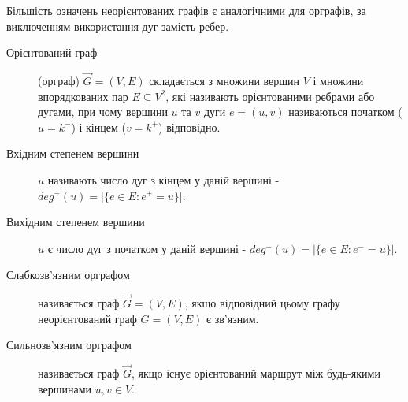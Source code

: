 
Більшість означень неорієнтованих графів є аналогічними для орграфів, за виключенням використання дуг замість ребер.

\begin{description}
  \item[Орієнтований граф] (орграф) $\overrightarrow G=(V,E)$ складається з множини вершин $V$ і множини впорядкованих пар $E \subseteq V^2$, які називають орієнтованими ребрами або дугами, при чому вершини $u$ та $v$ дуги $e=(u,v)$ називаються початком ($u=k^-$) і кінцем ($v=k^+$) відповідно.
  \item[Вхідним степенем вершини] $u$ називають число дуг з кінцем у даній вершині - $deg^+(u)=\vert\lbrace e \in E : e^+=u\rbrace \vert$.
  \item[Вихідним степенем вершини] $u$ є число дуг з початком у даній вершині - $deg^-(u)=\vert \lbrace e \in E : e^-=u \rbrace \vert$.
  \item[Слабкозв'язним орграфом] називається граф $\overrightarrow G=(V,E)$, якщо відповідний цьому графу неорієнтований граф $G=(V,E)$ є зв'язним.
  \item[Сильнозв'язним орграфом] називається граф $\overrightarrow G$, якщо існує орієнтований маршрут між будь-якими вершинами $u,v \in V$.
\end{description}
